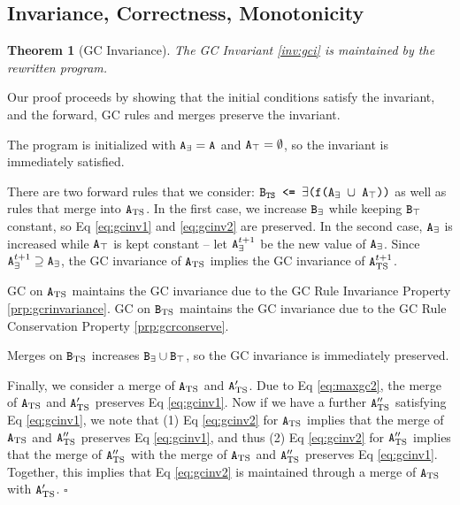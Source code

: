 \documentclass[10pt]{proc}
\newtheorem{thm}[theorem]{Theorem}
\newenvironment{proof}[1][Proof]{\begin{trivlist}\item[\hskip \labelsep {\textit {#1:}}]}{\end{trivlist}}
\renewcommand{\tt}[1]{\ifmmode\text{\texttt{#1}}\else\texttt{#1}\fi}
\begin{document}
\subsection{Invariance, Correctness, Monotonicity}
\begin{thm}[GC Invariance]\label{thm:gcinv}
The GC Invariant \ref{inv:gci} is maintained by the rewritten program.
\end{thm}
\begin{proof}
Our proof proceeds by showing that the initial conditions satisfy the invariant, and the forward, GC rules and merges preserve the invariant.

The program is initialized with $\tt{A}_\exists = \tt{A}$ and $\tt{A}_\top = \emptyset$, so the invariant is immediately satisfied.

There are two forward rules that we consider: $\tt{B$_\text{TS}$ <= $\exists$(f(A$_\exists$ $\cup$ A$_\top$))}$ as well as rules that merge into $\tt{A}_\text{TS}$.
In the first case, we increase $\tt{B}_\exists$ while keeping $\tt{B}_\top$ constant, so Eq \eqref{eq:gcinv1} and \eqref{eq:gcinv2} are preserved.
In the second case, $\tt{A}_\exists$ is increased while $\tt{A}_\top$ is kept constant -- let $\tt{A}_\exists^{t+1}$ be the new value of $\tt{A}_\exists$.
Since $\tt{A}_\exists^{t+1} \supseteq \tt{A}_\exists$, the GC invariance of $\tt{A}_\text{TS}$ implies the GC invariance of $\tt{A}_\text{TS}^{t+1}$.

GC on $\tt{A}_\text{TS}$ maintains the GC invariance due to the GC Rule Invariance Property \ref{prp:gcrinvariance}.
GC on $\tt{B}_\text{TS}$ maintains the GC invariance due to the GC Rule Conservation Property \ref{prp:gcrconserve}.

Merges on $\tt{B}_\text{TS}$ increases $\tt{B}_\exists \cup \tt{B}_\top$, so the GC invariance is immediately preserved.

Finally, we consider a merge of $\tt{A}_\text{TS}$ and $\tt{A}_\text{TS}'$.
Due to Eq \eqref{eq:maxgc2}, the merge of $\tt{A}_\text{TS}$ and $\tt{A}_\text{TS}'$ preserves Eq \eqref{eq:gcinv1}.
Now if we have a further $\tt{A}_\text{TS}''$ satisfying Eq \eqref{eq:gcinv1}, we note that (1) Eq \eqref{eq:gcinv2} for $\tt{A}_\text{TS}$ implies that the merge of $\tt{A}_\text{TS}$ and $\tt{A}_\text{TS}''$ preserves Eq \eqref{eq:gcinv1}, and thus (2) Eq \eqref{eq:gcinv2} for $\tt{A}_\text{TS}''$ implies that the merge of $\tt{A}_\text{TS}''$ with the merge of $\tt{A}_\text{TS}$ and $\tt{A}_\text{TS}''$ preserves Eq \eqref{eq:gcinv1}.
Together, this implies that Eq \eqref{eq:gcinv2} is maintained through a merge of $\tt{A}_\text{TS}$ with $\tt{A}_\text{TS}'$.
$\square$
\end{proof}
\end{document}
